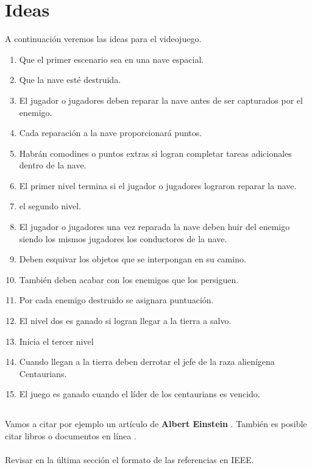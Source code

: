\documentclass{article}
\begin{document}
\section{Ideas} \label{contenido}
A continuación veremos las ideas para el videojuego.
\begin{enumerate}
    \item Que el primer escenario sea en una nave espacial.
    \item Que la nave esté destruida.
    \item El jugador o jugadores deben reparar la nave antes de ser capturados por el enemigo.
    \item Cada reparación a la nave proporcionará puntos.
    \item Habrán comodines o puntos extras si logran completar tareas adicionales dentro de la nave.
    \item El primer nivel termina si el jugador o jugadores lograron reparar la nave.
    \item el segundo nivel.
    \item El jugador o jugadores una vez reparada la nave deben huir del enemigo siendo los mismos jugadores los conductores de la nave.
    \item Deben esquivar los objetos que se interpongan en su camino.
    \item También deben acabar con los enemigos que los persiguen.
    \item Por cada enemigo destruido se asignara puntuación.
    \item El nivel dos es ganado si logran llegar a la tierra a salvo.
    \item Inicia el tercer nivel
    \item Cuando llegan a la tierra deben derrotar el jefe de la raza alienígena Centaurians.
    \item El juego es ganado cuando el líder de los centaurians es vencido.
    
\end{enumerate}


\subsection{}
Vamos a citar por ejemplo un artículo de \textbf{Albert Einstein} \cite{einstein}.
También es posible citar libros \cite{dirac} o documentos en línea \cite{knuthwebsite}.\\\\
Revisar en la última sección el formato de las referencias en IEEE.
\end{document}
